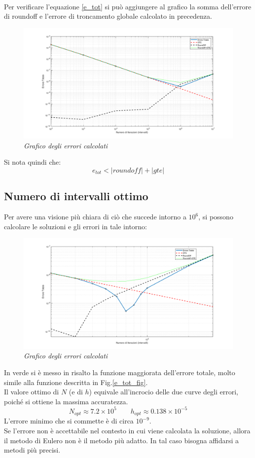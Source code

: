 \\Per verificare l'equazione \ref{e_tot} si può aggiungere al grafico la somma dell'errore di roundoff e l'errore di troncamento globale calcolato in precedenza.
\begin{figure}[H]
	\centering   
	\includegraphics[width=\textwidth]{matlab/esercizio1_errore_somma.png}
	\caption{\textit{Grafico degli errori calcolati}}
\end{figure}
Si nota quindi che:
\begin{equation*}
	e_{tot} < |roundoff| + |gte|
\end{equation*}
\subsection{Numero di intervalli ottimo}
Per avere una visione più chiara di ciò che succede intorno a $10^6$, si possono calcolare le soluzioni e gli errori in tale intorno:
\begin{figure}[H]
	\centering   
	\includegraphics[width=\textwidth]{matlab/esercizio1_errore_confronto.png}
	\caption{\textit{Grafico degli errori calcolati}}
\end{figure}
In verde si è messo in risalto la funzione maggiorata dell'errore totale, molto simile alla funzione descritta in Fig.\ref{e_tot_fig}.\\
Il valore ottimo di $N$ (e di $h$) equivale all'incrocio delle due curve degli errori, poiché si ottiene la massima accuratezza.
\begin{equation*}
	N_{opt} \approx 7.2\times10^5 \qquad h_{opt} \approx 0.138\times 10^{-5}
\end{equation*}
L'errore minimo che si commette è di circa $10^{-9}$.
\\Se l'errore non è accettabile nel contesto in cui viene calcolata la soluzione, allora il metodo di Eulero non è il metodo più adatto. In tal caso bisogna affidarsi a metodi più precisi.

